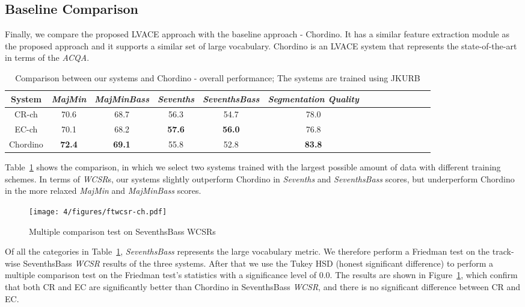 \subsection{Baseline Comparison}
Finally, we compare the proposed LVACE approach with the baseline approach - Chordino\cite{cannam2013mirex}. It has a similar feature extraction module as the proposed approach and it supports a similar set of large vocabulary. Chordino is an LVACE system that represents the state-of-the-art in terms of the \textit{ACQA}.
\begin{table}[htb]
	\caption{Comparison between our systems and Chordino - overall performance; The systems are trained using JKURB}
	\label{tab:4-cpcd}
	\centering
	\scriptsize
	\begin{tabular}{|c|c|c|c|c|c|c|c|c|c|c|c|c|c|}\hline
		System & \textit{MajMin} & \textit{MajMinBass} & \textit{Sevenths} & \textbf{\textit{SeventhsBass}} & \textit{Segmentation Quality}\\ \hline
		CR-ch & 70.6 & 68.7 & 56.3 & 54.7 & 78.0\\ \hline
		EC-ch & 70.1 & 68.2 & \textbf{57.6} & \textbf{56.0} & 76.8\\ \hline
		Chordino & \textbf{72.4} & \textbf{69.1} & 55.8 & 52.8 & \textbf{83.8}\\ \hline
	\end{tabular}
\end{table}

Table~\ref{tab:4-cpcd} shows the comparison, in which we select two systems trained with the largest possible amount of data with different training schemes. In terms of \textit{WCSR}s, our systems slightly outperform Chordino in \textit{Sevenths} and \textit{SeventhsBass} scores, but underperform Chordino in the more relaxed \textit{MajMin} and \textit{MajMinBass} scores.

\begin{figure}[h!]
	\centering
	\texttt{[image: 4/figures/ftwcsr-ch.pdf]}
	\caption{Multiple comparison test on SeventhsBass WCSRs}
	\label{fig:4-ftwcsr-ch}
\end{figure}
Of all the categories in Table~\ref{tab:4-cpcd}, \textit{SeventhsBass} represents the large vocabulary metric. We therefore perform a Friedman test on the track-wise SeventhsBass \textit{WCSR} results of the three systems. After that we use the Tukey HSD (honest significant difference) to perform a multiple comparison test on the Friedman test's statistics with a significance level of 0.0. The results are shown in Figure~\ref{fig:4-ftwcsr-ch}, which confirm that both CR and EC are significantly better than Chordino in SeventhsBass \textit{WCSR}, and there is no significant difference between CR and EC.

